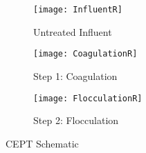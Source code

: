 \vspace{0.6cm}


	\begin{figure}[h!]
	\centering
  \begin{subfigure}[b]{0.25\linewidth}

\begin{center}    
    \texttt{[image: InfluentR]}
    \caption{Untreated Influent}
    \end{center}  
  \end{subfigure}
  \begin{subfigure}[b]{0.25\linewidth}
  
 \begin{center} 
    \texttt{[image: CoagulationR]}
    \caption{Step 1: Coagulation}
    \end{center} 
  \end{subfigure}
    \begin{subfigure}[b]{0.26\linewidth}
 
  \begin{center} 
    \texttt{[image: FlocculationR]}
    \caption{Step 2: Flocculation}
    \end{center} 
  \end{subfigure}
  
  
  \caption{CEPT Schematic}


\end{figure}				
			
